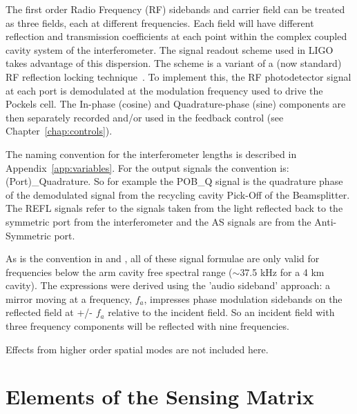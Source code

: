 The first order Radio Frequency (RF) sidebands and carrier field can be treated
as three fields, each at different frequencies. Each field will have different
reflection and transmission coefficients at each point within the complex coupled 
cavity system of the interferometer. The signal 
readout scheme used in LIGO takes advantage of this dispersion. The scheme is a 
variant of a (now standard) RF reflection locking
technique~\cite{Pound:Locking,Drever:PDH}. To implement this, the 
RF photodetector signal at each port is demodulated at the modulation frequency
used to drive the Pockels cell. The In-phase (cosine) and Quadrature-phase
(sine) components are then separately recorded and/or used in the feedback
control (see Chapter~\ref{chap:controls}).

The naming convention for the interferometer lengths is described in
Appendix~\ref{app:variables}. For the output signals the convention is:
(Port)\_Quadrature. So for example the POB\_Q signal is the quadrature
phase of the demodulated signal from the recycling cavity Pick-Off of the
Beamsplitter. The REFL
signals refer to the signals taken from the light reflected back to the
symmetric port from the interferometer and the AS signals are from the 
Anti-Symmetric port.

As is the convention in \cite{Regehr:Thesis} and \cite{Sigg:FreqResp}, all of
these signal formulae are only valid for frequencies below the arm cavity
free spectral range ($\sim$37.5 kHz for a 4 km cavity). The expressions were
derived using the 'audio sideband' approach: a mirror moving at a frequency,
$f_a$, impresses phase modulation sidebands on the reflected field 
at +/- $f_a$ relative to the incident field. So an incident field with three
frequency components will be reflected with nine frequencies.

Effects from higher order spatial modes are not included here.


\section{Elements of the Sensing Matrix}

